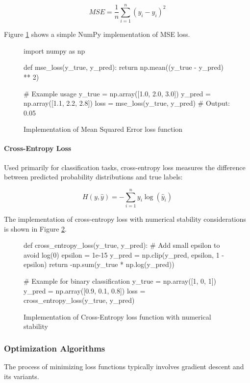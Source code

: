 \[ MSE = \frac{1}{n}\sum_{i=1}^n (y_i - \hat{y}_i)^2 \]

Figure \ref{fig:mse_implementation} shows a simple NumPy implementation of MSE loss.

\begin{figure}[h]
\begin{pythoncode}
import numpy as np

def mse_loss(y_true, y_pred):
    return np.mean((y_true - y_pred) ** 2)

# Example usage
y_true = np.array([1.0, 2.0, 3.0])
y_pred = np.array([1.1, 2.2, 2.8])
loss = mse_loss(y_true, y_pred)  # Output: 0.05
\end{pythoncode}
\caption{Implementation of Mean Squared Error loss function}
\label{fig:mse_implementation}
\end{figure}

\paragraph{Cross-Entropy Loss}
Used primarily for classification tasks, cross-entropy loss measures the difference between predicted probability distributions and true labels:

\[ H(y, \hat{y}) = -\sum_{i=1}^n y_i \log(\hat{y}_i) \]

The implementation of cross-entropy loss with numerical stability considerations is shown in Figure \ref{fig:cross_entropy_implementation}.

\begin{figure}[h]
\begin{pythoncode}
def cross_entropy_loss(y_true, y_pred):
    # Add small epsilon to avoid log(0)
    epsilon = 1e-15
    y_pred = np.clip(y_pred, epsilon, 1 - epsilon)
    return -np.sum(y_true * np.log(y_pred))

# Example for binary classification
y_true = np.array([1, 0, 1])
y_pred = np.array([0.9, 0.1, 0.8])
loss = cross_entropy_loss(y_true, y_pred)
\end{pythoncode}
\caption{Implementation of Cross-Entropy loss function with numerical stability}
\label{fig:cross_entropy_implementation}
\end{figure}

\subsubsection{Optimization Algorithms}
The process of minimizing loss functions typically involves gradient descent and its variants.

